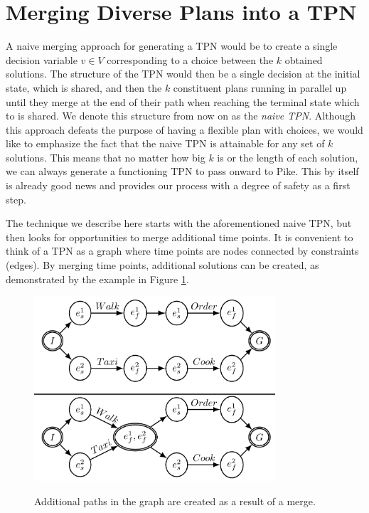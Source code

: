 \section{Merging Diverse Plans into a TPN}
\label{generating: merging}
A naive merging approach for generating a TPN would be to create a single decision variable $v \in V$ corresponding to a choice 
between the $k$ obtained solutions. 
The structure of the TPN would then be a single decision at the
initial state, which is shared, and then the $k$ constituent plans running in parallel
up until they merge at the end of their path when reaching the terminal state which to is shared.
We denote this structure from now on as the \textit{naive TPN}. 
Although this approach defeats the purpose of having a flexible plan with choices, we would like to emphasize 
the fact that the naive TPN is attainable for any set of $k$ solutions. This means that no matter how big $k$ is 
or the length of each solution, we can always generate a functioning TPN to pass onward to Pike.
This by itself is already good news and provides our process with a degree of safety as a first step. 
    
The technique we describe here starts with the aforementioned naive TPN, but then looks for opportunities to merge additional time points.
It is convenient to think of a TPN as a graph where time points are nodes connected by constraints (edges).
By merging time points, additional solutions can be created, as demonstrated by the example in Figure \ref{fig:add_plans_from_merge}.


\begin{figure}[h]
\centering
\includegraphics[width=0.8\textwidth]{graphics/merge.png}
 \label{fig:add_plans_from_merge}
\caption{Additional paths in the graph are created as a result of a merge.} 
\end{figure}

